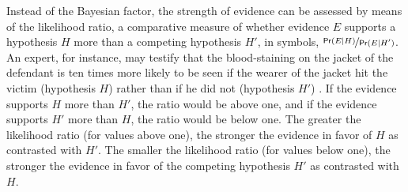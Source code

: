 \documentclass{article}
\newcommand{\pr}{\mathsf{Pr}}
\begin{document}


Instead of the Bayesian factor, the strength of evidence can be assessed by means of the likelihood ratio, a comparative measure of whether evidence $E$ supports a hypothesis $H$ more than a competing hypothesis $H'$, in symbols, $\nicefrac{\pr(E \vert H)}{\pr(E \vert H')}$. 
An expert, for instance, may testify that the blood-staining on the jacket of the defendant is ten times more likely to be seen if the wearer of the jacket hit the victim (hypothesis $H$) rather than if he did not (hypothesis $H'$) \citep[p.\ 38]{aitken2010fundamentals}. 
If the evidence supports $H$ more than $H'$, the ratio would be above one, and if the evidence supports $H'$ more than $H$, the ratio would be below one.  The greater the likelihood ratio (for values above one), the stronger the evidence in favor of $H$ as contrasted with $H'$. The smaller the likelihood ratio (for values below one), the stronger the evidence in favor of the competing hypothesis $H'$ as contrasted with $H$. 
\end{document}
